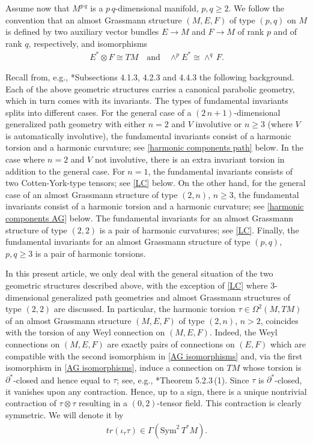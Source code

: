 \documentclass[11pt]{amsart}
\begin{document}
Assume now that $M^{p\,q}$ is a $p\,q$-dimensional manifold, $p,q\geq2$. We follow the convention that an almost Grassmann structure $(M,E,F)$ of type $(p,q)$ on $M$ is defined by two auxiliary vector bundles $E\to M$ and $F\to M$ of rank $p$ and of rank $q$, respectively, and isomorphisms
\begin{align}\label{AG isomorphisms}
    E^*\otimes F\cong TM\quad\text{and}\quad\wedge^pE^*\cong\wedge^q\,F.
\end{align}

Recall from, e.g., \cite{Book}*{Subsections 4.1.3, 4.2.3 and 4.4.3} the following background. Each of the above geometric structures carries a canonical parabolic geometry, which in turn comes with its invariants. The types of fundamental invariants splits into different cases. For the general case of a $(2\,n+1)$-dimensional generalized path geometry with either $n=2$ and $V$ involutive or $n\geq 3$ (where $V$ is automatically involutive), the fundamental invariants consist of a harmonic torsion and a harmonic curvature; see \eqref{harmonic components path} below. In the case where $n=2$ and $V$ not involutive, there is an extra invariant torsion in addition to the general case. For $n=1$, the fundamental invariants consists of two Cotten-York-type tensors; see \cref{LC} below. On the other hand, for the general case of an almost Grassmann structure of type $(2,n)$, $n\geq 3$, the fundamental invariants consist of a harmonic torsion and a harmonic curvature; see \eqref{harmonic components AG} below. The fundamental invariants for an almost Grassmann structure of type $(2,2)$ is a pair of harmonic curvatures; see \cref{LC}. Finally, the fundamental invariants for an almost Grassmann structure of type $(p,q)$, $p,q\geq 3$ is a pair of harmonic torsions. 

In this present article, we only deal with the general situation of the two geometric structures described above, with the exception of \cref{LC} where $3$-dimensional generalized path geometries and almost Grassmann structures of type $(2,2)$ are discussed. In particular, the harmonic torsion $\tau\in\Omega^2(M,TM)$ of an almost Grassmann structure $(M,E,F)$ of type $(2,n)$, $n>2$, coincides with the torsion of any Weyl connection on $(M,E,F)$. Indeed, the Weyl connections on $(M,E,F)$ are exactly pairs of connections on $(E,F)$ which are compatible with the second isomorphism in \eqref{AG isomorphisms} and, via the first isomorphism in \eqref{AG isomorphisms}, induce a connection on $TM$ whose torsion is $\partial^*$-closed and hence equal to $\tau$; see, e.g., \cite{Book}*{Theorem 5.2.3\,(1)}. Since $\tau$ is $\partial^*$-closed, it vanishes upon any contraction. Hence, up to a sign, there is a unique nontrivial contraction of $\tau\otimes\tau$ resulting in a $(0,2)$-tensor field. This contraction is clearly symmetric. We will denote it by
\begin{align}\label{torsion contraction def}
    tr(\iota_\tau\tau)\in\Gamma(\mathrm{Sym}^2\,T^*M).
\end{align}
\end{document}
